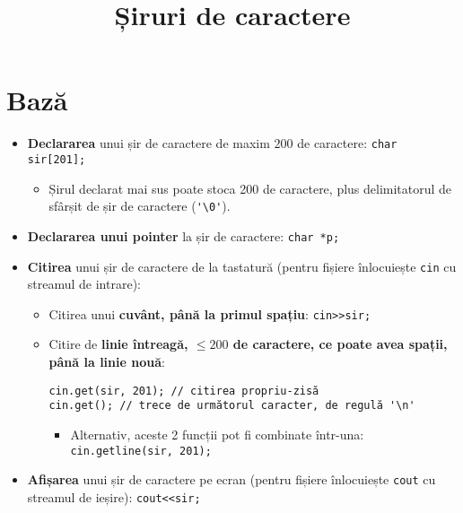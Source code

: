 \documentclass{article}
\title{Șiruri de caractere}
\author{}
\date{}
\begin{document}
\maketitle

\section*{Bază}
\begin{itemize}
    \item \textbf{Declararea} unui șir de caractere de maxim $200$ de caractere: \verb|char sir[201];|
    \begin{itemize}
        \item Șirul declarat mai sus poate stoca 200 de caractere, plus delimitatorul de sfârșit de șir de caractere (\verb|'\0'|).
    \end{itemize}
    \item \textbf{Declararea unui pointer} la șir de caractere: \verb|char *p;|
    \item \textbf{Citirea} unui șir de caractere de la tastatură (pentru fișiere înlocuiește \verb|cin| cu streamul de intrare):
    \begin{itemize}
        \item Citirea unui \textbf{cuvânt, până la primul spațiu}: \verb|cin>>sir;|
        \item Citire de \textbf{linie întreagă, $\leq 200$ de caractere, ce poate avea spații, până la linie nouă}:
        \begin{verbatim}
cin.get(sir, 201); // citirea propriu-zisă
cin.get(); // trece de următorul caracter, de regulă '\n'
        \end{verbatim}
        \begin{itemize}
            \item Alternativ, aceste 2 funcții pot fi combinate într-una: \verb|cin.getline(sir, 201);|
        \end{itemize}
    \end{itemize}
    \item \textbf{Afișarea} unui șir de caractere pe ecran (pentru fișiere înlocuiește \verb|cout| cu streamul de ieșire): \verb|cout<<sir;|
\end{itemize}
\end{document}
